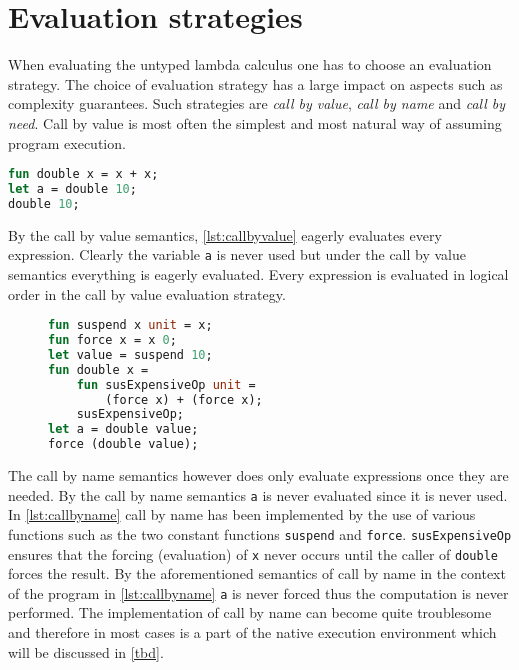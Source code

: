 \documentclass[11pt,oneside,a4paper]{report}
\begin{document}
\section{Evaluation strategies}
\label{sec:es}
When evaluating the untyped lambda calculus one has to choose an evaluation strategy.
The choice of evaluation strategy has a large impact on aspects such as complexity guarantees.
Such strategies are \textit{call by value}, \textit{call by name} and \textit{call by need}.
Call by value is most often the simplest and most natural way of assuming program execution.
\begin{lstlisting}[language=ML,caption={Program that doubles values},label={lst:callbyvalue},mathescape=true]
fun double x = x + x;
let a = double 10;
double 10;
\end{lstlisting}
By the call by value semantics, \autoref{lst:callbyvalue} eagerly evaluates every expression.
Clearly the variable \texttt{a} is never used but under the call by value semantics everything is eagerly evaluated.
Every expression is evaluated in logical order in the call by value evaluation strategy.
\begin{figure}[ht]
\begin{lstlisting}[language=ML,caption={Implementation of call by name},label={lst:callbyname},mathescape=true]
fun suspend x unit = x;
fun force x = x 0;
let value = suspend 10;
fun double x = 
    fun susExpensiveOp unit = 
        (force x) + (force x);
    susExpensiveOp;
let a = double value;
force (double value);
\end{lstlisting}
\end{figure}
The call by name semantics however does only evaluate expressions once they are needed.
By the call by name semantics \texttt{a} is never evaluated since it is never used.
In \autoref{lst:callbyname} call by name has been implemented by the use of various functions such as the two constant functions \texttt{suspend} and \texttt{force}.
\texttt{susExpensiveOp} ensures that the forcing (evaluation) of \texttt{x} never occurs until the caller of \texttt{double} forces the result.
By the aforementioned semantics of call by name in the context of the program in \autoref{lst:callbyname} \texttt{a} is never forced thus the computation is never performed.
The implementation of call by name can become quite troublesome and therefore in most cases is a part of the native execution environment which will be discussed in \autoref{tbd}.
\end{document}
